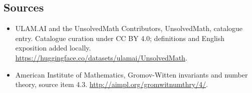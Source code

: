 \documentclass[11pt]{article}
\begin{document}
\subsection{Sources}
\begin{itemize}
\item[\hypertarget{source:statement:1}{S1}] ULAM.AI and the UnsolvedMath Contributors, UnsolvedMath, catalogue entry. Catalogue curation under CC BY 4.0; definitions and English exposition added locally.
\url{https://huggingface.co/datasets/ulamai/UnsolvedMath}.
\item[\hypertarget{source:statement:2}{S2}] American Institute of Mathematics, Gromov-Witten invariants and number theory, source item 4.3.
\url{http://aimpl.org/gromwitnumthry/4/}.
\end{itemize}
\label{end:statement}
\end{document}
